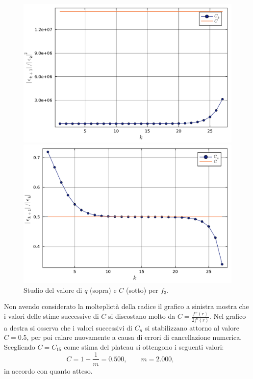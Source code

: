 \documentclass[letterpaper, 12pt]{article}
\numberwithin{equation}{section}    %
\begin{document}
\begin{figure}[!ht]
    \begin{minipage}[b]{0.47\textwidth}
        \centering
        \includegraphics[width=\textwidth]{3323_C1.pdf}
        \caption*{}
    \end{minipage}
    \hspace{0.5cm}
    \begin{minipage}[b]{0.47\textwidth}
        \centering
        \includegraphics[width=\textwidth]{3323_C2.pdf}
        \caption*{}
    \end{minipage}

    \caption{Studio del valore di $q$ (sopra) e $C$ (sotto) per $f_3$.}
    \label{fig:es3_3_2_6}
\end{figure}

Non avendo considerato la molteplictà della radice il grafico a sinistra mostra che i valori 
delle stime successive di $C$ si discostano molto da $C = \frac{ f''(r)}{2 f'(r)}$. Nel grafico
a destra si osserva che i valori successivi di $C_n$ si stabilizzano attorno al valore 
$C = 0.5$, per poi calare nuovamente a causa di errori di cancellazione numerica. \\
Scegliendo $C = C_{15}$ come stima del plateau si ottengono i seguenti valori:
\begin{equation*}
    C = 1 - \frac{1}{m} = 0.500,
    \qquad
    m = 2.000,
    \qquad
\end{equation*}
in accordo con quanto atteso. 
\end{document}
